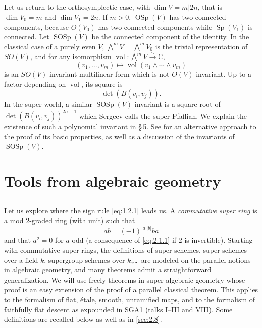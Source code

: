 \documentclass[11pt,a4paper]{article}
\theoremstyle{plain}
\theoremstyle{definition}
\DeclareMathOperator{\vol}{vol}
\DeclareMathOperator{\OSp}{OSp}
\DeclareMathOperator{\SOSp}{SOSp}
\DeclareMathOperator{\Sp}{Sp}
\newcommand{\simto}{\xrightarrow{\sim}}
\newcommand{\C}{\mathbb{C}}
\begin{document}
\subsection{}
Let us return to the orthosymplectic case, with $\dim V = m|2n$, that is $\dim V_0 = m$ and $\dim V_1 = 2n$. If $m > 0$, $\OSp(V)$ has two connected components, because $O(V_0)$ has two connected components while $\Sp(V_1)$ is connected. Let $\SOSp(V)$ be the connected component of the identity. In the classical case of a purely even $V$, $\bigwedge^m V = \bigwedge^m V_0$ is the trivial representation of $SO(V)$, and for any isomorphism $\vol: \bigwedge^m V \simto \C$,
\[
(v_1, \dots, v_m) \mapsto \vol(v_1 \wedge \cdots \wedge v_m)
\]
is an $SO(V)$-invariant multilinear form which is not $O(V)$-invariant. Up to a factor depending on $\vol$, its square is
\[
\det(B(v_i, v_j)).
\]
In the super world, a similar $\SOSp(V)$-invariant is a square root of $\det(B(v_i, v_j))^{2n+1}$ which Sergeev calls the super Pfaffian. We explain the existence of such a polynomial invariant in \S\,5. See \cite{LZ15} for an alternative approach to the proof of its basic properties, as well as a discussion of the invariants of $\SOSp(V)$.

\section{Tools from algebraic geometry}

\subsection{}
Let us explore where the sign rule \eqref{eq:1.2.1} leads us. A \emph{commutative super ring} is a mod 2-graded ring (with unit) such that
\begin{equation}\label{eq:2.1.1}
ab = (-1)^{|a||b|} ba
\end{equation}
and that $a^2 = 0$ for $a$ odd (a consequence of \eqref{eq:2.1.1} if $2$ is invertible). Starting with commutative super rings, the definitions of super schemes, super schemes over a field $k$, supergroup schemes over $k$,\dots\ are modeled on the parallel notions in algebraic geometry, and many theorems admit a straightforward generalization. We will use freely theorems in super algebraic geometry whose proof is an easy extension of the proof of a parallel classical theorem. This applies to the formalism of flat, \'etale, smooth, unramified maps, and to the formalism of faithfully flat descent as expounded in SGA1 (talks I--III and VIII). Some definitions are recalled below as well as in \ref{sec:2.8}.
\end{document}
